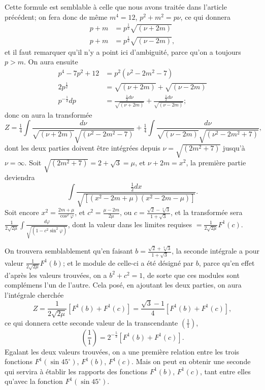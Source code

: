 \documentclass{article}
\begin{document}
Cette formule est semblable à celle que nous avons traitée dans l'article précédent; on fera donc de même $m^{4}=12$, $p^{2}+m^{2}=p\nu$, ce qui donnera
\[ \begin{aligned} p+m&=p^{\frac{1}{2}}\sqrt{(\nu+2m)}\\ p+m&=p^{\frac{1}{2}}\sqrt{(\nu-2m)}, \end{aligned} \]
et il faut remarquer qu'il n'y a point ici d'ambiguité, parce qu'on a toujours $p>m$. On aura ensuite
\[ \begin{aligned} p^{4}-7p^{2}+12&=p^{2}(\nu^{2}-2m^{2}-7)\\ 2p^{\frac{1}{2}}&=\sqrt{(\nu+2m)}+\sqrt{(\nu-2m)}\\ p^{-\frac{1}{2}}dp&=\frac{\tfrac{1}{2}d\nu}{\sqrt{(\nu+2m)}}+\frac{\tfrac{1}{2}d\nu}{\sqrt{(\nu-2m)}}; \end{aligned} \]
donc on aura la transformée
\[ Z=\tfrac{1}{4}\int\frac{d\nu}{\sqrt{(\nu+2m)}\sqrt{(\nu^{2}-2m^{2}-7)}}+\tfrac{1}{4}\int\frac{d\nu}{\sqrt{(\nu-2m)}\sqrt{(\nu^{2}-2m^{2}+7)}}, \]
dont les deux parties doivent être intégrées depuis $\nu=\sqrt{(2m^{2}+7)}$ jusqu'à $\nu=\infty$. Soit $\sqrt{(2m^{2}+7)}=2+\sqrt{3}=\mu$, et $\nu+2m=x^{2}$, la première partie deviendra
\[ \int\frac{\tfrac{1}{2}dx}{\sqrt{[(x^{2}-2m+\mu)(x^{2}-2m-\mu)]}}. \]
Soit encore $x^{2}=\frac{2m+\mu}{\cos^{2}\varphi}$, et $c^{2}=\frac{\mu-2m}{2\mu}$, ou $c=\frac{\sqrt{2}-\sqrt[4]{3}}{1+\sqrt{3}}$, et la transformée sera $\frac{1}{2\sqrt{2\mu}}\displaystyle\int\frac{d\varphi}{\sqrt{(1-c^{2}\sin^{2}\varphi)}}$, dont la valeur dans les limites requises $=\frac{1}{2\sqrt{2\mu}}F^{1}(c)$.


On trouvera semblablement qu'en faisant $b=\frac{\sqrt{2}+\sqrt[4]{3}}{1+\sqrt{3}}$, la seconde intégrale a pour valeur $\frac{1}{2\sqrt{2\mu}}F^{1}(b)$; et le module de celle-ci a été désigné par $b$, parce qu'en effet d'après les valeurs trouvées, on a $b^{2}+c^{2}=1$, de sorte que ces modules sont complémens l'un de l'autre. Cela posé, en ajoutant les deux parties, on aura l'intégrale cherchée
\[ Z=\frac{1}{2\sqrt{2\mu}}[F^{1}(b)+F^{1}(c)]=\frac{\sqrt{3}-1}{4}[F^{1}(b)+F^{1}(c)], \]
ce qui donnera cette seconde valeur de la transcendante $\left(\frac{1}{1}\right)$,
\[ \left(\frac{1}{1}\right)=2^{-\frac{5}{3}}[F^{1}(b)+F^{1}(c)]. \]
Egalant les deux valeurs trouvées, on a une première relation entre les trois fonctions $F^{1}(\sin 45^{\circ})$, $F^{1}(b)$, $F^{1}(c)$. Mais on peut en obtenir une seconde qui servira à établir les rapports des fonctions $F^{1}(b)$, $F^{1}(c)$, tant entre elles qu'avec la fonction $F^{1}(\sin 45^{\circ})$.
\end{document}
